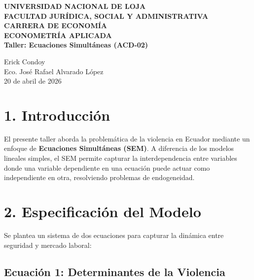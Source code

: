 \documentclass[12pt,spanish]{article}
\begin{document}
\begin{center}
    {\bfseries \Large UNIVERSIDAD NACIONAL DE LOJA}\\[0.3cm]
    {\bfseries \large FACULTAD JURÍDICA, SOCIAL Y
ADMINISTRATIVA}\\[0.2cm]
    {\bfseries CARRERA DE ECONOMÍA}\\[1.5cm]
    
    {\bfseries \large ECONOMETRÍA APLICADA}\\[1cm]
    
    {\bfseries \Large Taller: Ecuaciones Simultáneas (ACD-02)}\\[1.5cm]
\end{center}

 Erick Condoy \\
 Eco. José Rafael Alvarado López \\
 20 de abril de 2026 \\

\vspace{1cm}

\doublespacing
\setlength{\parindent}{1.27cm}

\section{1. Introducción}\label{introducciuxf3n}

El presente taller aborda la problemática de la violencia en Ecuador
mediante un enfoque de \textbf{Ecuaciones Simultáneas (SEM)}. A
diferencia de los modelos lineales simples, el SEM permite capturar la
interdependencia entre variables donde una variable dependiente en una
ecuación puede actuar como independiente en otra, resolviendo problemas
de endogeneidad.

\section{2. Especificación del
Modelo}\label{especificaciuxf3n-del-modelo}

Se plantea un sistema de dos ecuaciones para capturar la dinámica entre
seguridad y mercado laboral:

\subsection{Ecuación 1: Determinantes de la
Violencia}\label{ecuaciuxf3n-1-determinantes-de-la-violencia}
\end{document}

